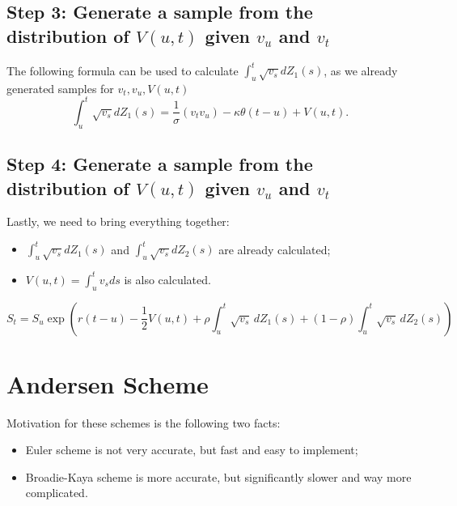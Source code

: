         \subsection*{Step 3: Generate a sample from the distribution of $V(u, t)$ given $v_u$ and $v_t$}
            The following formula can be used to calculate $\int_{u}^t \sqrt{v_s} dZ_1(s)$, as we already generated samples for $v_t , v_u, V(u, t)$
            \begin{equation}
                \int_{u}^t \sqrt{v_s} dZ_1(s) = \frac{1}{\sigma}(v_t v_u) - \kappa\theta(t-u) + V(u, t).
            \end{equation}

        \subsection*{Step 4: Generate a sample from the distribution of $V(u, t)$ given $v_u$ and $v_t$}
            Lastly, we need to bring everything together:
            \begin{itemize}
                \item $\int_{u}^t \sqrt{v_s} dZ_1(s)$ and $\int_{u}^t \sqrt{v_s} dZ_2(s)$ are already calculated;
                \item $V(u, t) = \int_{u}^t v_s ds $ is also calculated.
            \end{itemize}
            \begin{equation}
                S_t = S_u \exp{\left( r(t-u)-\frac{1}{2} V(u, t)  + \rho\int_{u}^{t} \sqrt{v_s} \, dZ_1(s) + (1-\rho)\int_{u}^{t} \sqrt{v_s} \, dZ_2(s)  \right)}
            \end{equation}

    \section{Andersen Scheme}
        Motivation for these schemes is the following two facts:
        \begin{itemize}
            \item Euler scheme is not very accurate, but fast and easy to implement;
            \item Broadie-Kaya scheme is more accurate, but significantly slower and way more complicated.
        \end{itemize}
